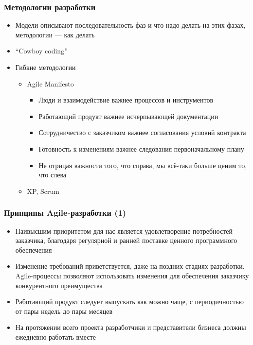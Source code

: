 \documentclass{../../slides-style}
\begin{document}
    \begin{frame}
        \frametitle{Методологии разработки}
        \begin{itemize}
            \item Модели описывают последовательность фаз и что надо делать на этих фазах, методологии --- как делать
            \item ``Cowboy coding''
            \item Гибкие методологии
            \begin{itemize}
                \item Agile Manifesto
                \begin{itemize}
                    \item Люди и взаимодействие важнее процессов и инструментов
                    \item Работающий продукт важнее исчерпывающей документации
                    \item Сотрудничество с заказчиком важнее согласования условий контракта
                    \item Готовность к изменениям важнее следования первоначальному плану
                    \item Не отрицая важности того, что справа, мы всё-таки больше ценим то, что слева
                \end{itemize}
                \item XP, Scrum
            \end{itemize}
        \end{itemize}
    \end{frame}

    \begin{frame}
        \frametitle{Принципы Agile-разработки (1)}
        \begin{itemize}
            \item Наивысшим приоритетом для нас является удовлетворение потребностей заказчика, благодаря регулярной и ранней поставке ценного программного обеспечения
            \item Изменение требований приветствуется, даже на поздних стадиях разработки. Agile-процессы позволяют использовать изменения для обеспечения заказчику конкурентного преимущества
            \item Работающий продукт следует выпускать как можно чаще, с периодичностью от пары недель до пары месяцев
            \item На протяжении всего проекта разработчики и представители бизнеса должны ежедневно работать вместе
        \end{itemize}
    \end{frame}
\end{document}
